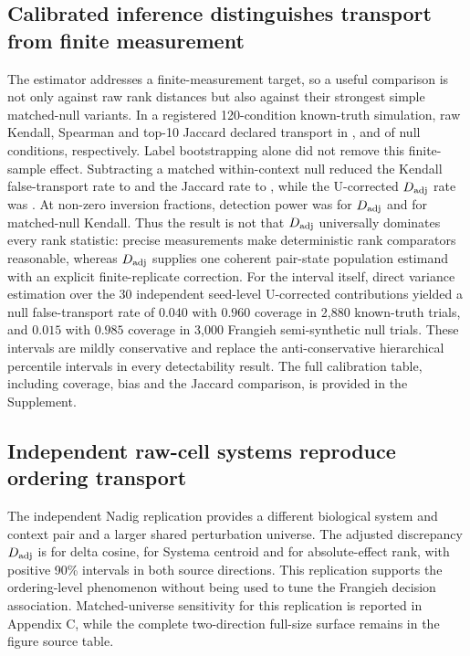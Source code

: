 \documentclass{article}
\begin{document}
\subsection{Calibrated inference distinguishes transport from finite measurement}
The estimator addresses a finite-measurement target, so a useful comparison is
not only against raw rank distances but also against their strongest simple
matched-null variants. In a registered 120-condition known-truth simulation,
raw Kendall, Spearman and top-10 Jaccard declared transport in
\PTLNullKendallFTR{}, \PTLNullSpearmanFTR{} and \PTLNullJaccardFTR{} of null
conditions, respectively. Label bootstrapping alone did not remove this
finite-sample effect. Subtracting a matched within-context null reduced the
Kendall false-transport rate to \PTLNullKendallMatchedFTR{} and the Jaccard
rate to \PTLNullJaccardMatchedFTR{}, while the U-corrected $D_{\rm adj}$ rate
was \PTLNullDAdjFTR{}. At non-zero inversion fractions, detection power was
\PTLAltDAdjPower{} for $D_{\rm adj}$ and \PTLAltKendallMatchedPower{} for
matched-null Kendall. Thus the result is not that $D_{\rm adj}$ universally
dominates every rank statistic: precise measurements make deterministic rank
comparators reasonable, whereas $D_{\rm adj}$ supplies one coherent
pair-state population estimand with an explicit finite-replicate correction.
For the interval itself, direct variance estimation over the 30 independent
seed-level U-corrected contributions yielded a null false-transport rate of
$0.040$ with $0.960$ coverage in 2,880 known-truth trials, and $0.015$ with
$0.985$ coverage in 3,000 Frangieh semi-synthetic null trials. These intervals
are mildly conservative and replace the anti-conservative hierarchical
percentile intervals in every detectability result.
The full calibration table, including coverage, bias and the Jaccard
comparison, is provided in the Supplement.

\subsection{Independent raw-cell systems reproduce ordering transport}
The independent Nadig replication provides a different biological system and
context pair and a larger shared perturbation universe. The adjusted discrepancy
$D_{\rm adj}$ is \PTLNadigDelta{} for
delta cosine, \PTLNadigSystema{} for Systema centroid and \PTLNadigRank{} for absolute-effect rank,
with positive 90\% intervals in both source directions. This replication
  supports the ordering-level phenomenon without being used to tune the
  Frangieh decision association. Matched-universe sensitivity for this
  replication is reported in Appendix C, while the complete two-direction
  full-size surface remains in the figure source table.
\end{document}
